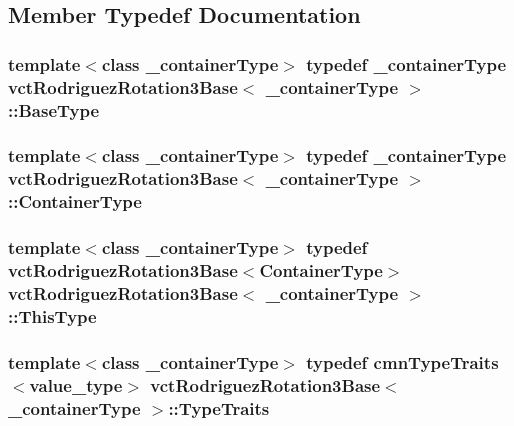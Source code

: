 \subsection{Member Typedef Documentation}
\hypertarget{classvct_rodriguez_rotation3_base_a4269d1ae12fda0dd92eccb3ad5089ce5}{
\subsubsection[{Base\-Type}]{\setlength{\rightskip}{0pt plus 5cm}template$<$class \-\_\-container\-Type$>$ typedef \-\_\-container\-Type {\bf vct\-Rodriguez\-Rotation3\-Base}$<$ \-\_\-container\-Type $>$\-::{\bf Base\-Type}}}\label{classvct_rodriguez_rotation3_base_a4269d1ae12fda0dd92eccb3ad5089ce5}
\hypertarget{classvct_rodriguez_rotation3_base_a121aa7d7f143b0c59ef190ff9bff57d2}{
\subsubsection[{Container\-Type}]{\setlength{\rightskip}{0pt plus 5cm}template$<$class \-\_\-container\-Type$>$ typedef \-\_\-container\-Type {\bf vct\-Rodriguez\-Rotation3\-Base}$<$ \-\_\-container\-Type $>$\-::{\bf Container\-Type}}}\label{classvct_rodriguez_rotation3_base_a121aa7d7f143b0c59ef190ff9bff57d2}
\hypertarget{classvct_rodriguez_rotation3_base_add2bccab7f6e86c98b3f97fd00b06dcc}{
\subsubsection[{This\-Type}]{\setlength{\rightskip}{0pt plus 5cm}template$<$class \-\_\-container\-Type$>$ typedef {\bf vct\-Rodriguez\-Rotation3\-Base}$<${\bf Container\-Type}$>$ {\bf vct\-Rodriguez\-Rotation3\-Base}$<$ \-\_\-container\-Type $>$\-::{\bf This\-Type}}}\label{classvct_rodriguez_rotation3_base_add2bccab7f6e86c98b3f97fd00b06dcc}
\hypertarget{classvct_rodriguez_rotation3_base_a862714ccf1a5b0f77a49e7983204474f}{
\subsubsection[{Type\-Traits}]{\setlength{\rightskip}{0pt plus 5cm}template$<$class \-\_\-container\-Type$>$ typedef {\bf cmn\-Type\-Traits}$<$value\-\_\-type$>$ {\bf vct\-Rodriguez\-Rotation3\-Base}$<$ \-\_\-container\-Type $>$\-::{\bf Type\-Traits}}}\label{classvct_rodriguez_rotation3_base_a862714ccf1a5b0f77a49e7983204474f}


